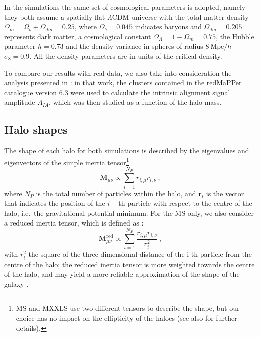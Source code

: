 \documentclass[a4paper,fleqn,usenatbib]{mnras}
\begin{document}
In the simulations the same set of cosmological parameters is adopted, namely they both assume a spatially flat $\Lambda$CDM universe with the total matter density $\Omega_m = \Omega_b + \Omega_{dm} = 0.25$, where $\Omega _b = 0.045$ indicates baryons and $\Omega_{dm} = 0.205$ represents dark matter, a cosmological constant $\Omega_{\Lambda} = 1 - \Omega_m = 0.75$, the Hubble parameter $h = 0.73$ and the density variance in spheres of radius $8 \ \mbox{Mpc}/h$ $\sigma_8 = 0.9$. All the density parameters are in units of the critical density.

To compare our results with real data, we also take into consideration the analysis presented in \citet{vanUitertJoachimi2017}: in that work, the clusters contained in the redMaPPer catalogue \citep{Rykoffetal2014} version 6.3 were used to calculate the intrinsic alignment signal amplitude $A_{IA}$, which was then studied as a function of the halo mass. 

\subsection{Halo shapes}
\label{subsec:haloshapes}
The shape of each halo for both simulations is described by the eigenvalues and eigenvectors of the simple inertia tensor\footnote{MS and MXXLS use two different tensors to describe the shape, but our choice has no impact on the ellipticity of the haloes (see also \citet{Bettetal2007} for further details).}
\begin{equation}
    \mathbf{M}_{\mu \nu} \propto \sum_{i=1}^{N_P} r_{i, \mu} r_{i, \nu} \ ,
	\label{eq:sit}
\end{equation}
where $N_P$ is the total number of particles within the halo, and $\mathbf{r}_{i}$ is the vector that indicates the position of the $i-$th particle with respect to the centre of the halo, i.e.\ the gravitational potential minimum. For the MS only, we also consider a reduced inertia tensor, which is defined as \citep{Pereiraetal2008}:
\begin{equation}
    \mathbf{M}_{\mu \nu}^{\mbox{red}} \propto \sum _{i=1}^{N_P} \frac{r_{i, \mu} r_{i, \nu}}{r_i^2} \ ,
	\label{eq:rit}
\end{equation}
with $r_i^2$ the square of the three-dimensional distance of the i-th particle from the centre of the halo; the reduced inertia tensor is more weighted towards the centre of the halo, and may yield a more reliable approximation of the shape of the galaxy \citep{Joachimietal2013b, Chisarietal2015}. 
\end{document}
